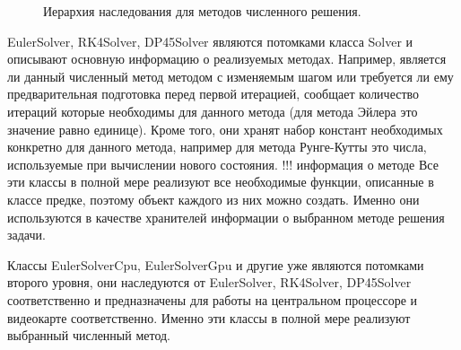 \documentclass[a4paper, 14pt]{article}
\theoremstyle{definition}
\begin{document}
\begin{figure}[h]
	\caption{Иерархия наследования для методов численного решения.}
	\label{ris:solvers}
\end{figure}

\par EulerSolver, RK4Solver, DP45Solver являются потомками класса Solver и описывают основную информацию о реализуемых методах. Например, является ли данный численный метод методом с изменяемым шагом или требуется ли ему предварительная подготовка перед первой итерацией, сообщает количество итераций которые необходимы для данного метода (для метода Эйлера это значение равно единице). Кроме того, они хранят набор констант необходимых конкретно для данного метода, например для метода Рунге-Кутты это числа, используемые при вычислении нового состояния.
!!! информация о методе 
Все эти классы в полной мере реализуют все необходимые функции, описанные в классе предке, поэтому объект каждого из них можно создать. Именно они используются в качестве хранителей информации о выбранном методе решения задачи.

\par Классы EulerSolverCpu, EulerSolverGpu и другие уже являются потомками второго уровня, они наследуются от EulerSolver, RK4Solver, DP45Solver соответственно и предназначены для работы на центральном процессоре и видеокарте соответственно. Именно эти классы в полной мере реализуют выбранный численный метод.
\end{document}

